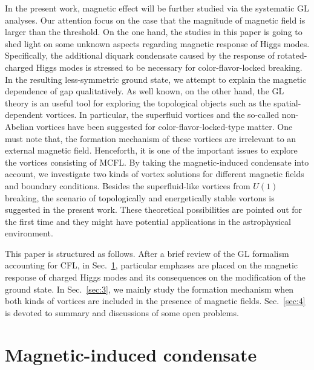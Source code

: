 \documentclass[prd, showpacs,nofootinbib,amsmath,amssymb]{revtex4}
\begin{document}
In the present work, magnetic effect will be further studied via the systematic GL analyses. Our attention focus on the case that the magnitude of magnetic field is larger than the threshold. On the one hand, the studies in this paper is going to shed light on some unknown aspects regarding magnetic response of Higgs modes.
Specifically, the additional diquark condensate caused by the response of rotated-charged Higgs modes is stressed to be necessary for color-flavor-locked breaking. In the resulting less-symmetric ground state, we attempt to explain the magnetic dependence of gap qualitatively. As well known, on the other hand, the GL theory is an useful tool for exploring the topological objects such
as the spatial-dependent vortices. In particular, the superfluid vortices and the so-called non-Abelian vortices have been suggested for
color-flavor-locked-type matter.
One must note that, the formation mechanism of these vortices are irrelevant to an external magnetic
field. Henceforth, it is one of the important issues to explore the vortices consisting of MCFL. By taking
the magnetic-induced condensate into account, we investigate two kinds of vortex solutions for different magnetic
fields and boundary conditions. Besides the superfluid-like vortices from $U(1)$ breaking, the scenario of
topologically and energetically stable vortons is suggested in the present work. These theoretical possibilities
are pointed out for the first time and they might have potential applications in the astrophysical environment.

This paper is structured as follows. After a brief review of the GL formalism accounting for CFL, in
Sec.~\ref{sec:2}, particular emphases are placed on the magnetic response of charged Higgs modes and its
consequences on the modification of the ground state. In Sec.~\ref{sec:3}, we mainly study the formation
mechanism when both kinds of vortices are included in the presence of magnetic fields. Sec.~\ref{sec:4} is
devoted to summary and discussions of some open problems.

\section{Magnetic-induced condensate}
\label{sec:2}
\end{document}
